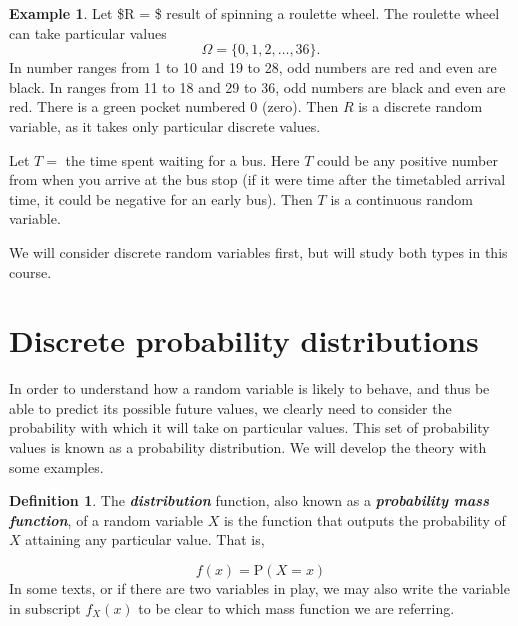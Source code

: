 \documentclass[
]{book}
\theoremstyle{definition}
\newtheorem{definition}{Definition}[chapter]
\theoremstyle{definition}
\newtheorem{example}{Example}[chapter]
\theoremstyle{definition}
\theoremstyle{definition}
\theoremstyle{remark}
\begin{document}
\begin{example}
Let \$R = \$ result of spinning a roulette wheel. The roulette wheel can take particular values
\[\Omega = \{0,1,2, \dots,36\}.\]
In number ranges from 1 to 10 and 19 to 28, odd numbers are red and even are black. In ranges from 11 to 18 and 29 to 36, odd numbers are black and even are red. There is a green pocket numbered 0 (zero). Then \(R\) is a discrete random variable, as it takes only particular discrete values.

Let \(T =\) the time spent waiting for a bus. Here \(T\) could be any positive number from when you arrive at the bus stop (if it were time after the timetabled arrival time, it could be negative for an early bus). Then \(T\) is a continuous random variable.
\end{example}

We will consider discrete random variables first, but will study both types in this course.

\hypertarget{discrete-probability-distributions}{%
\section{Discrete probability distributions}\label{discrete-probability-distributions}}

In order to understand how a random variable is likely to behave, and thus be able to predict its possible future values, we clearly need to consider the probability with which it will take on particular values. This set of probability values is known as a probability distribution. We will develop the theory with some examples.

\begin{definition}
The \textbf{\emph{distribution}} function, also known as a \textbf{\emph{probability mass function}}, of a random variable \(X\) is the function that outputs the probability of \(X\) attaining any particular value. That is,

\[f(x) = \text{P}(X=x)\]
In some texts, or if there are two variables in play, we may also write the variable in subscript \(f_X(x)\) to be clear to which mass function we are referring.
\end{definition}
\end{document}
